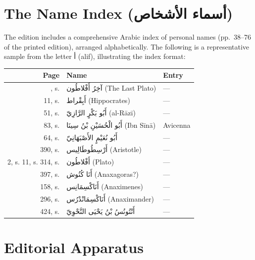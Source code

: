 \documentclass[11pt,a4paper]{article}
\def\RL#1{\beginR#1\endR}
\newcommand{\textarabic}[1]{{\arabicfont\RL{#1}}}
\begin{document}
\newpage

\section{The Name Index (\textarabic{أسماء الأشخاص})}
\label{sec:index}

The edition includes a comprehensive Arabic index of personal names (pp.~38--76 of the printed edition), arranged alphabetically. The following is a representative sample from the letter \textarabic{أ} (alif), illustrating the index format:

\begin{center}
\begin{longtable}{rp{8cm}l}
\toprule
\textbf{Page} & \textbf{Name} & \textbf{Entry} \\
\midrule
\endhead
\bottomrule
\endfoot
2, s.  & \textarabic{آخِرُ أَفْلاطُون} (The Last Plato) & --- \\
11, s. & \textarabic{أَبِقْراط} (Hippocrates) & --- \\
51, s. & \textarabic{أَبُو بَكْرٍ الرَّازِيّ} (al-Rāzī) & --- \\
83, s. & \textarabic{أَبُو الْحُسَيْنِ بْنُ سِينَا} (Ibn Sīnā) & Avicenna \\
64, s. & \textarabic{أَبُو نُعَيْمٍ الأَصْبَهَانِيّ} & --- \\
390, s. & \textarabic{أَرْسِطُوطَالِيس} (Aristotle) & --- \\
2, s. 11, s. 314, s. & \textarabic{أَفْلاطُون} (Plato) & --- \\
397, s. & \textarabic{أَنَا كُنُوش} (Anaxagoras?) & --- \\
158, s. & \textarabic{أَنَاكْسِمَانِس} (Anaximenes) & --- \\
296, s. & \textarabic{أَنَاكْسِمَانْدْرُس} (Anaximander) & --- \\
424, s. & \textarabic{أَنْتُونُسُ بْنُ يَحْيَى النَّحْوِيّ} & --- \\
\bottomrule
\end{longtable}
\end{center}

\newpage

\section{Editorial Apparatus}
\label{sec:editorial}
\end{document}
